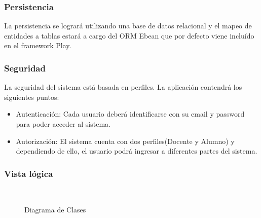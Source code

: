 \subsubsection{Persistencia}
La persistencia se logrará utilizando una base de datos relacional y el mapeo de entidades a tablas estará a cargo del ORM Ebean que por defecto viene incluído en el framework Play.

\subsubsection{Seguridad}
La seguridad del sistema está basada en perfiles. La aplicación contendrá los siguientes puntos:

\begin{itemize}
	\item Autenticación: Cada usuario deberá identificarse con su email y password para poder acceder al sistema.
	\item Autorización: El sistema cuenta con dos perfiles(Docente y Alumno) y dependiendo de ello, el usuario podrá ingresar a diferentes partes del sistema.
	\end{itemize}

\subsubsection{Vista lógica}
\begin{figure}[!h]
\centering
\\
\caption{Diagrama de Clases}\label{fig:c4_diagrama_de_clases}
\end{figure}

